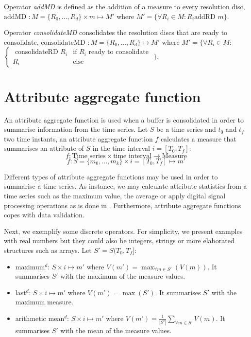 Operator \emph{addMD} is defined as the addition of a measure to every
resolution disc, $\text{addMD } : M=\{R_0,\dotsc,R_d\} \times m
\mapsto M' $ where $M'= \{ \forall R_i\in M: R_i \text{
  addRD } m \}$.


Operator \emph{consolidateMD} consolidates the resolution discs that
are ready to consolidate, $\text{consolidateMD } :
M=\{R_0,\dotsc,R_d\} \mapsto M'$ where $ M'= \big\{ \forall R_i\in M:$
  $\begin{cases}
    \text{ consolidateRD } R_i & \text{if } R_i \text{ ready to consolidate} \\
    R_i & \text{else }
  \end{cases}$ $\big\}
  $.








\section{Attribute aggregate function}
\label{sec:model:interpolador}


An attribute aggregate function is used when a buffer is
consolidated in order to summarise information from the time series.
Let $S$ be a time series and $t_0$ and $t_f$ two time instants, an
attribute aggregate function $f$ calculates a measure that
summarises an attribute of $S$ in the time interval $i=[T_0,T_f]$:
\[
f: \text{Time series} \times \text{time interval} \longrightarrow
\text{Measure}
\]
\[
f: S=\{m_0,\ldots,m_k\} \times i=[T_0,T_f] \mapsto m'
\]

Different types of attribute aggregate functions may be used in
order to summarise a time series. As instance, we may calculate
attribute statistics from a time series such as the maximum value, the
average or apply digital signal processing operations as is done in
\cite{zhang11}.  Furthermore, attribute aggregate functions copes with
data validation.%

Next, we exemplify some discrete operators. For simplicity, we present
examples with real numbers but they could also be integers, strings or
more elaborated structures such as arrays. Let $S'=S(T_0,T_f]$:
\begin{itemize}
\item maximum$^d$: $S \times i \mapsto m'$ where $V(m') = \max_{\forall m
    \in S'}(V(m))$. It summarises $S'$ with the maximum of
  the measure values.
\item last$^d$: $S \times i \mapsto m'$ where $V(m') = \max(S')$. It
  summarises $S'$ with the maximum measure.
\item arithmetic mean$^d$: $S \times i \mapsto m'$ where $V(m') =
  \frac{1}{|S'|} \sum\limits_{\forall m\in S'} V(m)$. It
  summarises $S'$ with the mean of the measure values.
\end{itemize}




